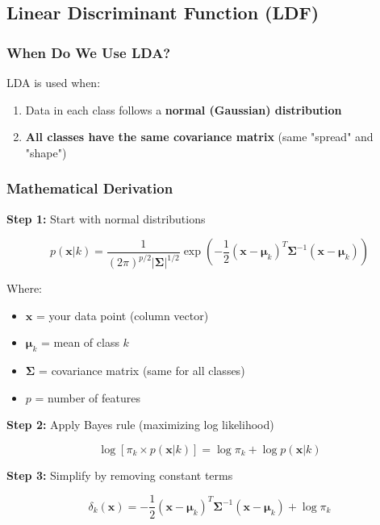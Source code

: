 \documentclass[12pt,a4paper]{article}
\begin{document}
\subsection{Linear Discriminant Function (LDF)}

\subsubsection{When Do We Use LDA?}

LDA is used when:
\begin{enumerate}
    \item Data in each class follows a \textbf{normal (Gaussian) distribution}
    \item \textbf{All classes have the same covariance matrix} (same "spread" and "shape")
\end{enumerate}

\subsubsection{Mathematical Derivation}

\textbf{Step 1:} Start with normal distributions

\begin{equation}
p(\mathbf{x}|k) = \frac{1}{(2\pi)^{p/2} |\boldsymbol{\Sigma}|^{1/2}} \exp\left(-\frac{1}{2} (\mathbf{x}-\boldsymbol{\mu}_k)^T\boldsymbol{\Sigma}^{-1}(\mathbf{x}-\boldsymbol{\mu}_k)\right)
\end{equation}

Where:
\begin{itemize}
    \item $\mathbf{x}$ = your data point (column vector)
    \item $\boldsymbol{\mu}_k$ = mean of class $k$
    \item $\boldsymbol{\Sigma}$ = covariance matrix (same for all classes)
    \item $p$ = number of features
\end{itemize}

\textbf{Step 2:} Apply Bayes rule (maximizing log likelihood)

\begin{equation}
\log[\pi_k \times p(\mathbf{x}|k)] = \log \pi_k + \log p(\mathbf{x}|k)
\end{equation}

\textbf{Step 3:} Simplify by removing constant terms

\begin{equation}
\delta_k(\mathbf{x}) = -\frac{1}{2} (\mathbf{x}-\boldsymbol{\mu}_k)^T\boldsymbol{\Sigma}^{-1}(\mathbf{x}-\boldsymbol{\mu}_k) + \log \pi_k
\end{equation}
\end{document}

